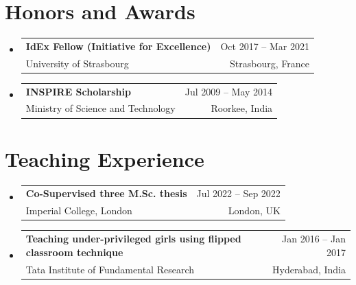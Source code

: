 \documentclass[A4,11pt]{article}
\makeatletter
\newcommand{\CVSubheading}[4]{
  \vspace{-2pt}\item
    \begin{tabular*}{0.97\textwidth}[t]{l@{\extracolsep{\fill}}r}
      \textbf{#1} & #2 \\
      \small#3 & \small #4 \\
    \end{tabular*}\vspace{-7pt}
}
\newcommand{\CVSubHeadingListStart}{\begin{itemize}[leftmargin=0.5cm, label={}]}
\newcommand{\CVSubHeadingListEnd}{\end{itemize}}
\makeatother
\begin{document}
\section{Honors and Awards}
  \CVSubHeadingListStart
    \CVSubheading
    {IdEx Fellow (Initiative for Excellence)}{Oct 2017 -- Mar 2021}
      {University of Strasbourg}{Strasbourg, France}
    \CVSubheading
    {INSPIRE Scholarship}{Jul 2009 -- May 2014}
      {Ministry of Science and Technology}{Roorkee, India}
  \CVSubHeadingListEnd

\section{Teaching Experience}
  \CVSubHeadingListStart
    \CVSubheading
      {Co-Supervised three M.Sc. thesis}{Jul 2022 -- Sep 2022}
      {Imperial College, London}{London, UK}
    \CVSubheading
      {Teaching under-privileged girls using flipped classroom
      technique}{Jan 2016 -- Jan 2017}
      {Tata Institute of Fundamental Research}{Hyderabad, India}
  \CVSubHeadingListEnd

\end{document}
